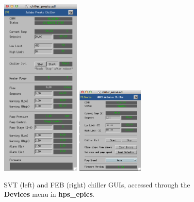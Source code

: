 \begin{figure}[!ht]
    \begin{center}
        \includegraphics[width=4cm]{figures/svt_svtChiller.png}
        \includegraphics[width=0.3\textwidth]{figures/svt_febChiller.png}
        \caption{SVT (left) and FEB (right) chiller GUIs, accessed through the \textbf{Devices} menu in \textbf{hps\_epics}.}
        \label{fig:ctrl_cooling_chillers}
    \end{center}
\end{figure}

